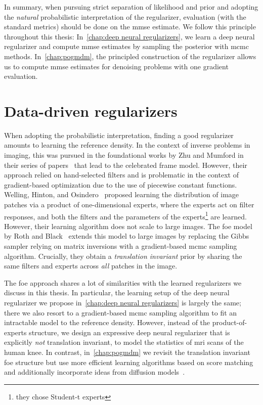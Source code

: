 In summary, when pursuing strict separation of likelihood and prior and adopting the \emph{natural} probabilistic interpretation of the regularizer, evaluation (with the standard metrics) should be done on the \gls{mmse} estimate.
We follow this principle throughout this thesis:
In~\cref{chap:deep neural regularizers}, we learn a deep neural regularizer and compute \gls{mmse} estimates by sampling the posterior with \gls{mcmc} methods.
In~\cref{chap:pogmdm}, the principled construction of the regularizer allows us to compute \gls{mmse} estimates for denoising problems with one gradient evaluation.

\section{Data-driven regularizers}
When adopting the probabilistic interpretation, finding a good regularizer amounts to learning the reference density.
In the context of inverse problems in imaging, this was pursued in the foundational works by Zhu and Mumford in their series of papers~\cite{zhu_prior_1997,zhu_minimax_1997,zhu_filters_1998} that lead to the celebrated \gls{frame} model.
However, their approach relied on hand-selected filters and is problematic in the context of gradient-based optimization due to the use of piecewise constant functions.
Welling, Hinton, and Osindero~\cite{welling_learning_2002} proposed learning the distribution of image patches via a product of one-dimensional experts, where the experts act on filter responses, and both the filters and the parameters of the experts\footnote{they chose Student-t experts} are learned.
However, their learning algorithm does not scale to large images.
The \gls{foe} model by Roth and Black~\cite{RoBl09} extends this model to large images by replacing the Gibbs sampler relying on matrix inversions with a gradient-based \gls{mcmc} sampling algorithm.
Crucially, they obtain a \emph{translation invariant} prior by sharing the same filters and experts across \emph{all} patches in the image.

The \gls{foe} approach shares a lot of similarities with the learned regularizers we discuss in this thesis.
In particular, the learning setup of the deep neural regularizer we propose in~\cref{chap:deep neural regularizers} is largely the same;
there we also resort to a gradient-based \gls{mcmc} sampling algorithm to fit an intractable model to the reference density.
However, instead of the product-of-experts structure, we design an expressive deep neural regularizer that is explicitly \emph{not} translation invariant, to model the statistics of \gls{mri} scans of the human knee.
In contrast, in~\cref{chap:pogmdm} we revisit the translation invariant \gls{foe} structure but use more efficient learning algorithms based on score matching~\cite{hyvarinen_estimation_2005} and additionally incorporate ideas from diffusion models~\cite{song_scorebased_2021}.

